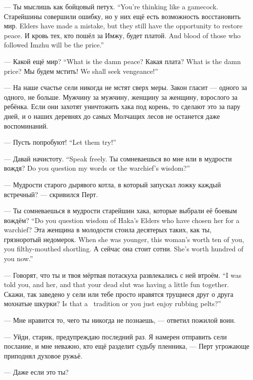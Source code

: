 {--- Ты мыслишь как бойцовый петух.}
{``You're thinking like a gamecock.}
{Старейшины совершили ошибку, но у них ещё есть возможность восстановить мир.}
{Elders have made a mistake, but they still have the opportunity to restore peace.}
{И кровь тех, кто пошёл за Имжу, будет платой.}
{And blood of those who followed Imzhu will be the price.''}

{--- Какой ещё мир?}
{``What is the damn peace?}
{Какая плата?}
{What is the damn price?}
{Мы будем мстить!}
{We shall seek vengeance!''}

--- На наше счастье сели никогда не мстят сверх меры.
Закон гласит --- одного за одного, не больше.
Мужчину за мужчину, женщину за женщину, взрослого за ребёнка.
Если они захотят уничтожить хака под корень, то сделают это за пару дней, и о наших деревнях до самых Молчащих лесов не останется даже воспоминаний.

{--- Пусть попробуют!}
{``Let them try!''}

{--- Давай начистоту.}
{``Speak freely.}
{Ты сомневаешься во мне или в мудрости вождя?}
{Do you question my words or the warchief's wisdom?''}

--- Мудрости старого дырявого котла, в который запускал ложку каждый встречный? --- скривился Перт.

{--- Ты сомневаешься в мудрости старейшин хака, которые выбрали её боевым вождём?}
{``Do you question wisdom of Haka's Elders who have chosen her for a warchief?}
{Эта женщина в молодости стоила десятерых таких, как ты, грязноротый недомерок.}
{When she was younger, this woman's worth ten of you, you filthy-mouthed shortling.}
{А сейчас она стоит сотни.}
{She's worth hundred of you now.''}

{--- Говорят, что ты и твоя мёртвая потаскуха развлекались с ней втроём.}
{``I was told you, and her, and that your dead slut was having a little fun together.}
{Скажи, так заведено у сели или тебе просто нравятся трущиеся друг о друга мохнатые шкурки?}
{Is that a \Seli\ tradition or you just enjoy rubbing pelts?''}

--- Мне нравится то, чего ты никогда не познаешь, --- ответил пожилой воин.

--- Уйди, старик, предупреждаю последний раз.
Я намерен отправить сели послание, и мне неважно, кто ещё разделит судьбу пленника, --- Перт угрожающе приподнял духовое ружьё.

--- Даже если это ты?

